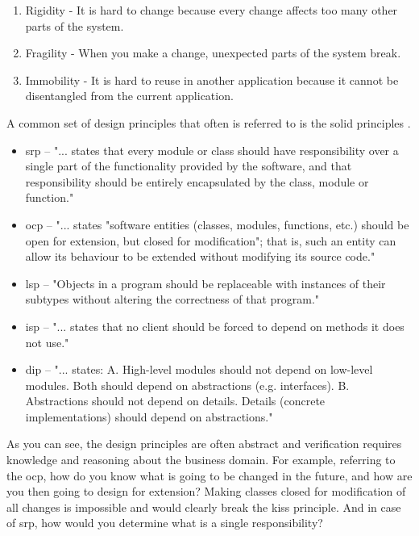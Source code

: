 \documentclass{report}
\begin{document}
\begin{enumerate}
	\item Rigidity - It is hard to change because every change affects too many other parts of the system.
	\item Fragility - When you make a change, unexpected parts of the system break.
	\item Immobility - It is hard to reuse in another application because it cannot be disentangled from the current application.
\end{enumerate}
A common set of design principles that often is referred to is the \gls{solid} principles \cite{solid}.

\begin{itemize}
    \item \gls{srp} -- "... states that every module or class should have responsibility over a single part of the functionality provided by the software, and that responsibility should be entirely encapsulated by the class, module or function." \cite{srp}
    \item \gls{ocp} -- "... states "software entities (classes, modules, functions, etc.) should be open for extension, but closed for modification"; that is, such an entity can allow its behaviour to be extended without modifying its source code." \cite{ocp}
    \item \gls{lsp} -- "Objects in a program should be replaceable with instances of their subtypes without altering the correctness of that program." \cite{lsp}
    \item \gls{isp} -- "... states that no client should be forced to depend on methods it does not use." \cite{isp}
    \item \gls{dip} --  "... states: \newline A. High-level modules should not depend on low-level modules. Both should depend on abstractions (e.g. interfaces). \newline
B. Abstractions should not depend on details. Details (concrete implementations) should depend on abstractions." \cite{dip}
\end{itemize}
    
As you can see, the design principles are often abstract and verification requires knowledge and reasoning about the business domain. For example, referring to the \gls{ocp}, how do you know what is going to be changed in the future, and how are you then going to design for extension? Making classes closed for modification of all changes is impossible and would clearly break the \gls{kiss} principle. And in case of \gls{srp}, how would you determine what is a single responsibility? 
\end{document}
